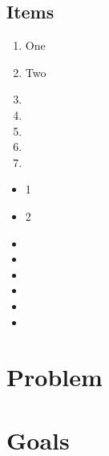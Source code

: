 \subsection{Items}

\par 

\begin{enumerate}
    \item One 
    \item Two
    \item 
    \item 
    \item 
    \item 
    \item 
\end{enumerate}

\begin{itemize}
    \item 1
    \item 2
    \item 
    \item 
    \item 
    \item 
    \item 
    \item 
\end{itemize}

\par 

\par 

\section{Problem}

\par 

\section{Goals}

